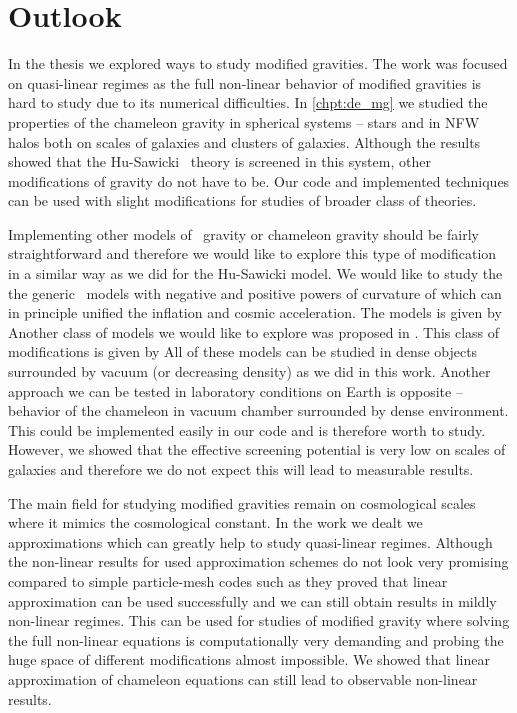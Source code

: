 \chapter{Outlook}
\label{chpt:outlook}
In the thesis we explored ways to study modified gravities. The work was focused on quasi-linear regimes as the full non-linear behavior of modified gravities is hard to study due to its numerical difficulties. In \autoref{chpt:de_mg} we studied the properties of the chameleon gravity in spherical systems -- stars and in NFW halos both on scales of galaxies and clusters of galaxies. Although the results showed that the Hu-Sawicki \fR\ theory is screened in this system, other modifications of gravity do not have to be. Our code and implemented techniques can be used with slight modifications for studies of broader class of theories.

Implementing other models of \fR\ gravity or chameleon gravity should be fairly straightforward and therefore we would like to explore this type of modification in a similar way as we did for the Hu-Sawicki model. We would like to study the the generic \fR\ models with negative and positive powers of curvature of \textcite{2003PhRvD..68l3512N} which can in principle unified the inflation and cosmic acceleration. The models is given by
Another class of models we would like to explore was proposed in \textcite{2007JETPL..86..157S}. This class of modifications is given by
All of these models can be studied in dense objects surrounded by vacuum (or decreasing density) as we did in this work. Another approach we can be tested in laboratory conditions on Earth is opposite -- behavior of the chameleon in vacuum chamber surrounded by dense environment. This could be implemented easily in our code and is therefore worth to study. However, we showed that the effective screening potential is very low on scales of galaxies and therefore we do not expect this will lead to measurable results.

The main field for studying modified gravities remain on cosmological scales where it mimics the cosmological constant. In the work we dealt we approximations which can greatly help to study quasi-linear regimes. Although the non-linear results for used approximation schemes do not look very promising compared to simple particle-mesh codes such as  they proved that linear approximation can be used successfully and we can still obtain results in mildly non-linear regimes. This can be used for studies of modified gravity where solving the full non-linear equations is computationally very demanding and probing the huge space of different modifications almost impossible. We showed that linear approximation of chameleon equations can still lead to observable non-linear results.

